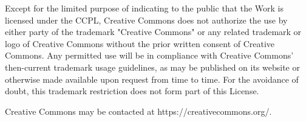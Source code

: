     Except for the limited purpose of indicating to the public that the
    Work is licensed under the CCPL, Creative Commons does not authorize
    the use by either party of the trademark "Creative Commons" or any
    related trademark or logo of Creative Commons without the prior
    written consent of Creative Commons. Any permitted use will be in
    compliance with Creative Commons' then-current trademark usage
    guidelines, as may be published on its website or otherwise made
    available upon request from time to time. For the avoidance of doubt,
    this trademark restriction does not form part of this License.

    Creative Commons may be contacted at https://creativecommons.org/.

